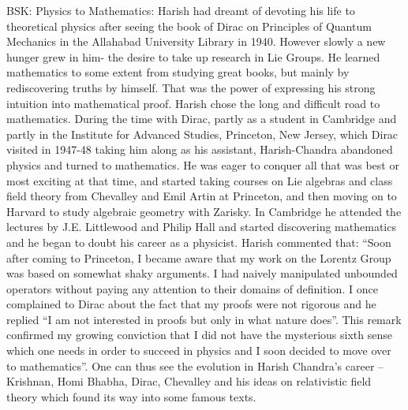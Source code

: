 BSK: Physics to Mathematics:  Harish had dreamt of devoting his life to theoretical physics after seeing the book of Dirac on Principles of Quantum Mechanics in the Allahabad University Library in 1940. However slowly a new hunger grew in him- the desire to take up research in Lie Groups. He learned mathematics to some extent from studying great books, but mainly by rediscovering truths by himself. That was the power of expressing his strong intuition into mathematical proof. Harish chose the long and difficult road to mathematics. During the time with Dirac, partly as a student in Cambridge and partly in the Institute for Advanced Studies, Princeton, New Jersey, which Dirac visited in 1947-48 taking him along as his assistant, Harish-Chandra abandoned physics and turned to mathematics. He was eager to conquer all that was best or most exciting at that time, and started taking courses on Lie algebras and class field theory from Chevalley and Emil Artin at Princeton, and then moving on to Harvard to study algebraic geometry with Zarisky. In Cambridge he attended the lectures by J.E. Littlewood and Philip Hall and started discovering mathematics and he began to doubt his career as a physicist. Harish commented that: “Soon after coming to Princeton, I became aware that my work on the Lorentz Group was based on somewhat shaky arguments.  I had naively manipulated unbounded operators without paying any attention to their domains of definition. I once complained to Dirac about the fact that my proofs were not rigorous and he replied “I am not interested in proofs but only in what nature does”.  This remark confirmed my growing conviction that I did not have the mysterious sixth sense which one needs in order to succeed in physics and I soon decided to move over to mathematics”. One can thus see the evolution in Harish Chandra’s career – Krishnan, Homi Bhabha, Dirac, Chevalley and his ideas on relativistic field theory which found its way into some famous texts.   
